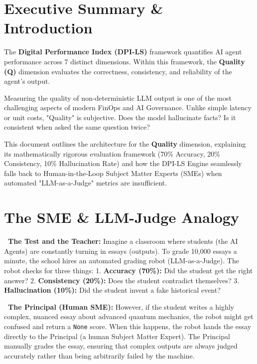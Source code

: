 \documentclass[11pt,a4paper]{article}
\begin{document}
\pagecolor{white}
\color{black}

\tableofcontents
\newpage

\section{Executive Summary \& Introduction}

\begin{dpinote}
The \textbf{Digital Performance Index (DPI-LS)} framework quantifies AI agent performance across 7 distinct dimensions. Within this framework, the \textbf{Quality (Q)} dimension evaluates the correctness, consistency, and reliability of the agent's output.
\end{dpinote}

Measuring the quality of non-deterministic LLM output is one of the most challenging aspects of modern FinOps and AI Governance. Unlike simple latency or unit costs, "Quality" is subjective. Does the model hallucinate facts? Is it consistent when asked the same question twice?

This document outlines the architecture for the \textbf{Quality} dimension, explaining its mathematically rigorous evaluation framework (70\% Accuracy, 20\% Consistency, 10\% Hallucination Rate) and how the DPI-LS Engine seamlessly falls back to Human-in-the-Loop Subject Matter Experts (SMEs) when automated "LLM-as-a-Judge" metrics are insufficient.

\vspace{0.5cm}

\section{The SME \& LLM-Judge Analogy}

\begin{tcolorbox}[enhanced, colback=dpiblue!5!white, colframe=dpiblue, title={\textbf{\faLightbulb\ The Automated Teacher Analogy}}, fonttitle=\bfseries, boxrule=1pt, arc=2mm, drop shadow]
\textbf{\color{dpiblue}\faGraduationCap\ The Test and the Teacher:} 
Imagine a classroom where students (the AI Agents) are constantly turning in essays (outputs). To grade 10,000 essays a minute, the school hires an automated grading robot (LLM-as-a-Judge). The robot checks for three things: 
1. \textbf{Accuracy (70\%):} Did the student get the right answer?
2. \textbf{Consistency (20\%):} Does the student contradict themselves?
3. \textbf{Hallucination (10\%):} Did the student invent a fake historical event?

\vspace{0.2cm}
\textbf{\color{dpired}\faUserTie\ The Principal (Human SME):}
However, if the student writes a highly complex, nuanced essay about advanced quantum mechanics, the robot might get confused and return a \texttt{None} score. When this happens, the robot hands the essay directly to the Principal (a human Subject Matter Expert). The Principal manually grades the essay, ensuring that complex outputs are always judged accurately rather than being arbitrarily failed by the machine.
\end{tcolorbox}
\end{document}
